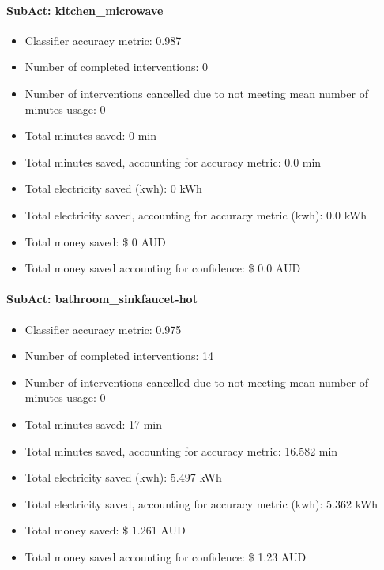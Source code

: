 \documentclass[11pt,]{article}
\providecommand{\tightlist}{%
  \setlength{\itemsep}{0pt}\setlength{\parskip}{0pt}}
\let\oldparagraph\paragraph
\renewcommand{\paragraph}[1]{\oldparagraph{#1}\mbox{}}
\begin{document}
\hypertarget{subact-kitchen_microwave}{%
\paragraph{SubAct: kitchen\_microwave}\label{subact-kitchen_microwave}}

\begin{itemize}
\tightlist
\item
  Classifier accuracy metric: 0.987
\item
  Number of completed interventions: 0
\item
  Number of interventions cancelled due to not meeting mean number of
  minutes usage: 0
\item
  Total minutes saved: 0 min
\item
  Total minutes saved, accounting for accuracy metric: 0.0 min
\item
  Total electricity saved (kwh): 0 kWh
\item
  Total electricity saved, accounting for accuracy metric (kwh): 0.0 kWh
\item
  Total money saved: \$ 0 AUD
\item
  Total money saved accounting for confidence: \$ 0.0 AUD
\end{itemize}

\hypertarget{subact-bathroom_sinkfaucet-hot}{%
\paragraph{SubAct:
bathroom\_sinkfaucet-hot}\label{subact-bathroom_sinkfaucet-hot}}

\begin{itemize}
\tightlist
\item
  Classifier accuracy metric: 0.975
\item
  Number of completed interventions: 14
\item
  Number of interventions cancelled due to not meeting mean number of
  minutes usage: 0
\item
  Total minutes saved: 17 min
\item
  Total minutes saved, accounting for accuracy metric: 16.582 min
\item
  Total electricity saved (kwh): 5.497 kWh
\item
  Total electricity saved, accounting for accuracy metric (kwh): 5.362
  kWh
\item
  Total money saved: \$ 1.261 AUD
\item
  Total money saved accounting for confidence: \$ 1.23 AUD
\end{itemize}
\end{document}
